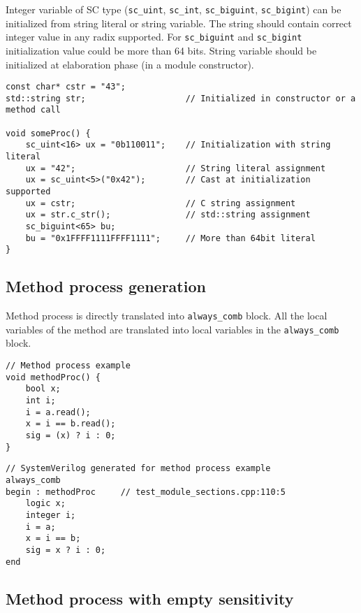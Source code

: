 Integer variable of SC type ({\tt sc\_uint}, {\tt sc\_int}, {\tt sc\_biguint}, {\tt sc\_bigint}) can be initialized from string literal or string variable. The string should contain correct integer value in any radix supported. For {\tt sc\_biguint} and {\tt sc\_bigint} initialization value could be more than 64 bits. String variable should be initialized at elaboration phase (in a module constructor).

\begin{lstlisting}[style=mycpp]
const char* cstr = "43";
std::string str;                    // Initialized in constructor or a method call

void someProc() {
    sc_uint<16> ux = "0b110011";    // Initialization with string literal
    ux = "42";                      // String literal assignment    
    ux = sc_uint<5>("0x42");        // Cast at initialization supported
    ux = cstr;                      // C string assignment
    ux = str.c_str();               // std::string assignment
    sc_biguint<65> bu;  
    bu = "0x1FFFF1111FFFF1111";     // More than 64bit literal
}
\end{lstlisting}

\subsection{Method process generation}\label{section:method_gen}

Method process is directly translated into {\tt always\_comb} block. All the local variables of the method are translated into local variables in the {\tt always\_comb} block. 

\begin{lstlisting}[style=mycpp]
// Method process example
void methodProc() {
    bool x;
    int i;
    i = a.read();
    x = i == b.read();
    sig = (x) ? i : 0;
}
\end{lstlisting}

\begin{lstlisting}[style=myverilog]
// SystemVerilog generated for method process example
always_comb 
begin : methodProc     // test_module_sections.cpp:110:5
    logic x;
    integer i;
    i = a;
    x = i == b;
    sig = x ? i : 0;
end
\end{lstlisting}

\subsection{Method process with empty sensitivity}\label{section:empty_gen}

